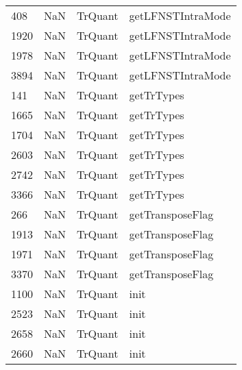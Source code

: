 \begin{tabular}{llll}
408  &                   NaN &                    TrQuant &                         getLFNSTIntraMode \\
1920 &                   NaN &                    TrQuant &                         getLFNSTIntraMode \\
1978 &                   NaN &                    TrQuant &                         getLFNSTIntraMode \\
3894 &                   NaN &                    TrQuant &                         getLFNSTIntraMode \\
141  &                   NaN &                    TrQuant &                                getTrTypes \\
1665 &                   NaN &                    TrQuant &                                getTrTypes \\
1704 &                   NaN &                    TrQuant &                                getTrTypes \\
2603 &                   NaN &                    TrQuant &                                getTrTypes \\
2742 &                   NaN &                    TrQuant &                                getTrTypes \\
3366 &                   NaN &                    TrQuant &                                getTrTypes \\
266  &                   NaN &                    TrQuant &                          getTransposeFlag \\
1913 &                   NaN &                    TrQuant &                          getTransposeFlag \\
1971 &                   NaN &                    TrQuant &                          getTransposeFlag \\
3370 &                   NaN &                    TrQuant &                          getTransposeFlag \\
1100 &                   NaN &                    TrQuant &                                      init \\
2523 &                   NaN &                    TrQuant &                                      init \\
2658 &                   NaN &                    TrQuant &                                      init \\
2660 &                   NaN &                    TrQuant &                                      init \\

\end{tabular}
